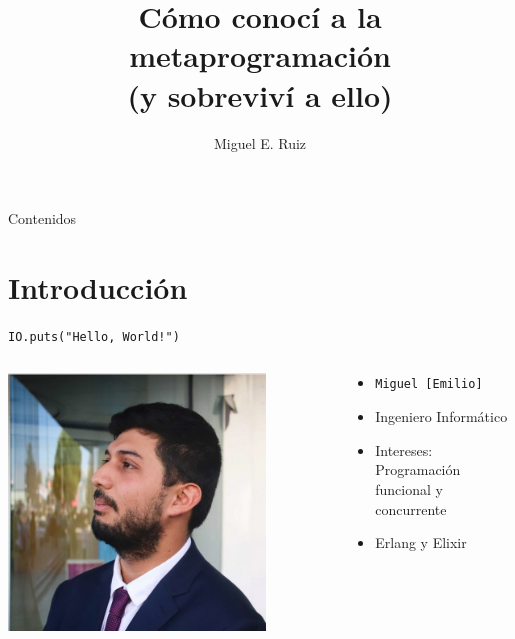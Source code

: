 \documentclass[14pt,aspectratio=169]{beamer}
\author[Miguel E. Ruiz]{Miguel E. Ruiz}
\title[\texttt{Madrid |> Elixir}]{Cómo conocí a la metaprogramación\\ (y sobreviví a ello)}
\date{\mydate}
\begin{document}
\begin{frame}
  \titlepage
\end{frame}

\begin{frame}{Contenidos}
  \tableofcontents[hideallsubsections]
\end{frame}

\section{Introducción}
\begin{frame}{\texttt{IO.puts("Hello, World!")}}
  \begin{columns}
    \begin{column}{0.5\textwidth}
      \centering
      \includegraphics[width=0.8\textwidth]{me-formal.jpg}
    \end{column}

    \begin{column}{0.5\textwidth}
      \begin{itemize}
        \item \texttt{Miguel [Emilio]}
        \item Ingeniero Informático
        \item Intereses: Programación funcional y concurrente
        \item Erlang y Elixir
      \end{itemize}
    \end{column}
  \end{columns}
\end{frame}
\end{document}
